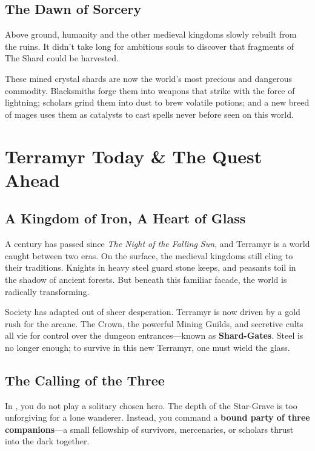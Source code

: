 \subsection{The Dawn of Sorcery}
Above ground, humanity and the other medieval kingdoms slowly rebuilt from the ruins. It didn’t take long for ambitious souls to discover that fragments of The Shard could be harvested. 

These mined crystal shards are now the world’s most precious and dangerous commodity. Blacksmiths forge them into weapons that strike with the force of lightning; scholars grind them into dust to brew volatile potions; and a new breed of mages uses them as catalysts to cast spells never before seen on this world. 

\newpage

\section{Terramyr Today \& The Quest Ahead}

\subsection{A Kingdom of Iron, A Heart of Glass}
A century has passed since \textit{The Night of the Falling Sun}, and Terramyr is a world caught between two eras. On the surface, the medieval kingdoms still cling to their traditions. Knights in heavy steel guard stone keeps, and peasants toil in the shadow of ancient forests. But beneath this familiar facade, the world is radically transforming. 

Society has adapted out of sheer desperation. Terramyr is now driven by a gold rush for the arcane. The Crown, the powerful Mining Guilds, and secretive cults all vie for control over the dungeon entrances—known as \textbf{Shard-Gates}. Steel is no longer enough; to survive in this new Terramyr, one must wield the glass.

\subsection{The Calling of the Three}
In \game{}, you do not play a solitary chosen hero. The depth of the Star-Grave is too unforgiving for a lone wanderer. Instead, you command a \textbf{bound party of three companions}—a small fellowship of survivors, mercenaries, or scholars thrust into the dark together. 

